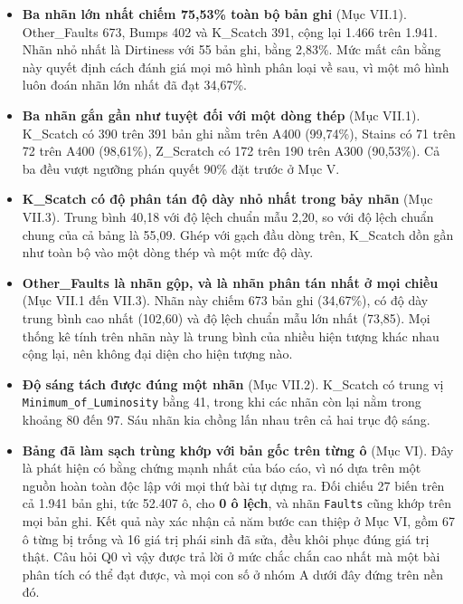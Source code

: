 \documentclass[12pt]{article}
\begin{document}
\begin{itemize}
    \item \textbf{Ba nhãn lớn nhất chiếm 75,53\% toàn bộ bản ghi} (Mục VII.1). Other\_Faults 673, Bumps 402 và K\_Scatch 391, cộng lại 1.466 trên 1.941. Nhãn nhỏ nhất là Dirtiness với 55 bản ghi, bằng 2,83\%. Mức mất cân bằng này quyết định cách đánh giá mọi mô hình phân loại về sau, vì một mô hình luôn đoán nhãn lớn nhất đã đạt 34,67\%.

    \item \textbf{Ba nhãn gắn gần như tuyệt đối với một dòng thép} (Mục VII.1). K\_Scatch có 390 trên 391 bản ghi nằm trên A400 (99,74\%), Stains có 71 trên 72 trên A400 (98,61\%), Z\_Scratch có 172 trên 190 trên A300 (90,53\%). Cả ba đều vượt ngưỡng phán quyết 90\% đặt trước ở Mục V.

    \item \textbf{K\_Scatch có độ phân tán độ dày nhỏ nhất trong bảy nhãn} (Mục VII.3). Trung bình 40,18 với độ lệch chuẩn mẫu 2,20, so với độ lệch chuẩn chung của cả bảng là 55,09. Ghép với gạch đầu dòng trên, K\_Scatch dồn gần như toàn bộ vào một dòng thép và một mức độ dày.

    \item \textbf{Other\_Faults là nhãn gộp, và là nhãn phân tán nhất ở mọi chiều} (Mục VII.1 đến VII.3). Nhãn này chiếm 673 bản ghi (34,67\%), có độ dày trung bình cao nhất (102,60) và độ lệch chuẩn mẫu lớn nhất (73,85). Mọi thống kê tính trên nhãn này là trung bình của nhiều hiện tượng khác nhau cộng lại, nên không đại diện cho hiện tượng nào.

    \item \textbf{Độ sáng tách được đúng một nhãn} (Mục VII.2). K\_Scatch có trung vị \texttt{Minimum\_of\_Luminosity} bằng 41, trong khi các nhãn còn lại nằm trong khoảng 80 đến 97. Sáu nhãn kia chồng lấn nhau trên cả hai trục độ sáng.

    \item \textbf{Bảng đã làm sạch trùng khớp với bản gốc trên từng ô} (Mục VI). Đây là phát hiện có bằng chứng mạnh nhất của báo cáo, vì nó dựa trên một nguồn hoàn toàn độc lập với mọi thứ bài tự dựng ra. Đối chiếu 27 biến trên cả 1.941 bản ghi, tức 52.407 ô, cho \textbf{0 ô lệch}, và nhãn \texttt{Faults} cũng khớp trên mọi bản ghi. Kết quả này xác nhận cả năm bước can thiệp ở Mục VI, gồm 67 ô từng bị trống và 16 giá trị phái sinh đã sửa, đều khôi phục đúng giá trị thật. Câu hỏi Q0 vì vậy được trả lời ở mức chắc chắn cao nhất mà một bài phân tích có thể đạt được, và mọi con số ở nhóm A dưới đây đứng trên nền đó.
\end{itemize}
\end{document}
